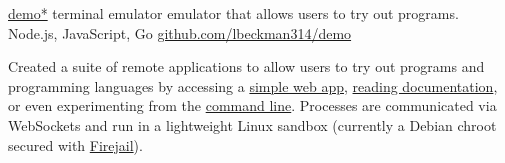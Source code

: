 \showoff
{\textcolor{my-blue}{\href{https://liambeckman.com/code/demo}{demo*}}}
{terminal emulator emulator that allows users to try out programs.}
{Node.js, JavaScript, Go}
{\textcolor{my-blue}{\href{https://github.com/lbeckman314/demo}{github.com/lbeckman314/demo}}}

Created a suite of remote applications to allow users to try out programs and programming languages by accessing a \textcolor{my-blue}{\href{https://voyager-index.herokuapp.com}{simple web app}}, \textcolor{my-blue}{\href{https://demo.liambeckman.com/docs-demonstration.html}{reading documentation}}, or even experimenting from the \textcolor{my-blue}{\href{https://github.com/lbeckman314/demo-cli.git}{command line}}. Processes are communicated via WebSockets and run in a lightweight Linux sandbox (currently a Debian chroot secured with \textcolor{my-blue}{\href{https://firejail.wordpress.com/}{Firejail}}).

\myBreak
